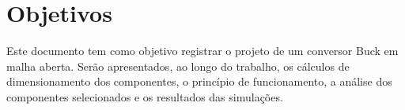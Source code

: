 \section{Objetivos} %

Este documento tem como objetivo registrar o projeto de um conversor Buck em malha aberta. Serão apresentados, ao longo do trabalho, os cálculos de dimensionamento dos componentes, o princípio de funcionamento, a análise dos componentes selecionados e os resultados das simulações.